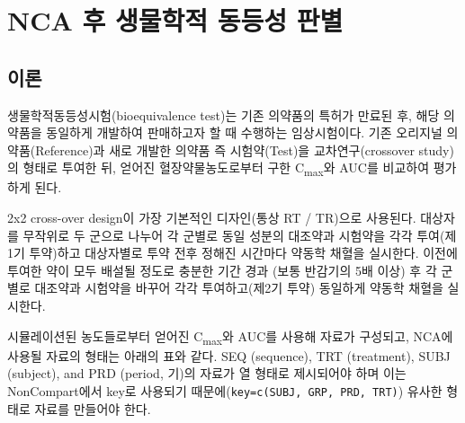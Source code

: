 \documentclass[
  11pt,
  krantz2, a4paper, twoside]{krantz}
\theoremstyle{definition}
\theoremstyle{definition}
\theoremstyle{definition}
\theoremstyle{definition}
\theoremstyle{remark}
\begin{document}
\hypertarget{bioequivalence}{%
\section{NCA 후 생물학적 동등성 판별}\label{bioequivalence}}

\hypertarget{uxc774uxb860}{%
\subsection{이론}\label{uxc774uxb860}}

생물학적동등성시험(bioequivalence test)는 기존 의약품의 특허가 만료된 후, 해당 의약품을 동일하게 개발하여 판매하고자 할 때 수행하는 임상시험이다.
기존 오리지널 의약품(Reference)과 새로 개발한 의약품 즉 시험약(Test)을 교차연구(crossover study)의 형태로 투여한 뒤, 얻어진 혈장약물농도로부터 구한 C\textsubscript{max}와 AUC를 비교하여 평가하게 된다.

2x2 cross-over design이 가장 기본적인 디자인(통상 RT / TR)으로 사용된다. 대상자를 무작위로 두 군으로 나누어 각 군별로 동일 성분의 대조약과 시험약을 각각 투여(제1기 투약)하고 대상자별로 투약 전후 정해진 시간마다 약동학 채혈을 실시한다. 이전에 투여한 약이 모두 배설될 정도로 충분한 기간 경과 (보통 반감기의 5배 이상) 후 각 군별로 대조약과 시험약을 바꾸어 각각 투여하고(제2기 투약) 동일하게 약동학 채혈을 실시한다. 

시뮬레이션된 농도들로부터 얻어진 C\textsubscript{max}와 AUC를 사용해 자료가 구성되고, NCA에 사용될 자료의 형태는 아래의 표와 같다. SEQ (sequence), TRT (treatment), SUBJ (subject), and PRD (period, 기)의 자료가 열 형태로 제시되어야 하며 이는 NonCompart에서 key로 사용되기 때문에(\texttt{key=c(\textquotesingle{}SUBJ\textquotesingle{},\ \textquotesingle{}GRP\textquotesingle{},\ \textquotesingle{}PRD\textquotesingle{},\ \textquotesingle{}TRT\textquotesingle{})}) 유사한 형태로 자료를 만들어야 한다. 
\end{document}
